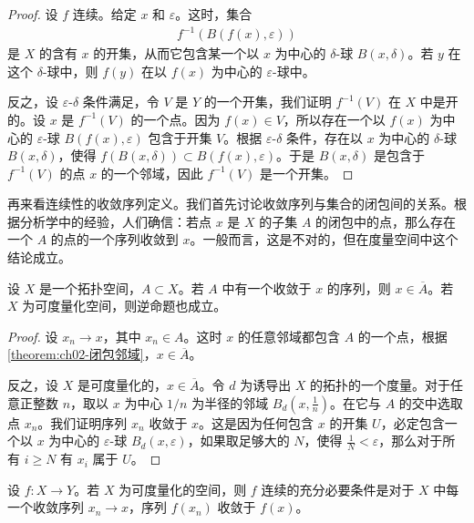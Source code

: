 \documentclass[../../main.tex]{subfiles}
\begin{document}
\begin{proof}
设 $f$ 连续。给定 $x$ 和 $\varepsilon$。这时，集合
\begin{align*}
f^{-1}(B(f(x), \varepsilon))
\end{align*}
是 $X$ 的含有 $x$ 的开集，从而它包含某一个以 $x$ 为中心的 $\delta$-球 $B(x, \delta)$。若 $y$ 在这个 $\delta$-球中，则 $f(y)$ 在以 $f(x)$ 为中心的 $\varepsilon$-球中。

反之，设 $\varepsilon$-$\delta$ 条件满足，令 $V$ 是 $Y$ 的一个开集，我们证明 $f^{-1}(V)$ 在 $X$ 中是开的。设 $x$ 是 $f^{-1}(V)$ 的一个点。因为 $f(x) \in V$，所以存在一个以 $f(x)$ 为中心的 $\varepsilon$-球 $B(f(x), \varepsilon)$ 包含于开集 $V$。根据 $\varepsilon$-$\delta$ 条件，存在以 $x$ 为中心的 $\delta$-球 $B(x, \delta)$，使得 $f(B(x, \delta)) \subset B(f(x), \varepsilon)$。于是 $B(x, \delta)$ 是包含于 $f^{-1}(V)$ 的点 $x$ 的一个邻域，因此 $f^{-1}(V)$ 是一个开集。
\end{proof}

再来看连续性的收敛序列定义。我们首先讨论收敛序列与集合的闭包间的关系。根据分析学中的经验，人们确信：若点 $x$ 是 $X$ 的子集 $A$ 的闭包中的点，那么存在一个 $A$ 的点的一个序列收敛到 $x$。一般而言，这是不对的，但在度量空间中这个结论成立。

\begin{lemma}[序列引理]\label{lemma:ch02-序列引理}
设 $X$ 是一个拓扑空间，$A \subset X$。若 $A$ 中有一个收敛于 $x$ 的序列，则 $x \in \overline{A}$。若 $X$ 为可度量化空间，则逆命题也成立。
\end{lemma}

\begin{proof}
设 $x_{n} \rightarrow x$，其中 $x_{n} \in A$。这时 $x$ 的任意邻域都包含 $A$ 的一个点，根据\cref{theorem:ch02-闭包邻域}，$x \in \overline{A}$。

反之，设 $X$ 是可度量化的，$x \in \overline{A}$。令 $d$ 为诱导出 $X$ 的拓扑的一个度量。对于任意正整数 $n$，取以 $x$ 为中心 $1/n$ 为半径的邻域 $B_{d}(x, \frac{1}{n})$。在它与 $A$ 的交中选取点 $x_{n}$。我们证明序列 $x_{n}$ 收敛于 $x$。这是因为任何包含 $x$ 的开集 $U$，必定包含一个以 $x$ 为中心的 $\varepsilon$-球 $B_{d}(x, \varepsilon)$，如果取足够大的 $N$，使得 $\frac{1}{N} < \varepsilon$，那么对于所有 $i \geqslant N$ 有 $x_{i}$ 属于 $U$。
\end{proof}

\begin{theorem}[序列连续性]\label{theorem:ch02-序列连续}
设 $f: X \rightarrow Y$。若 $X$ 为可度量化的空间，则 $f$ 连续的充分必要条件是对于 $X$ 中每一个收敛序列 $x_{n} \rightarrow x$，序列 $f(x_{n})$ 收敛于 $f(x)$。
\end{theorem}
\end{document}
